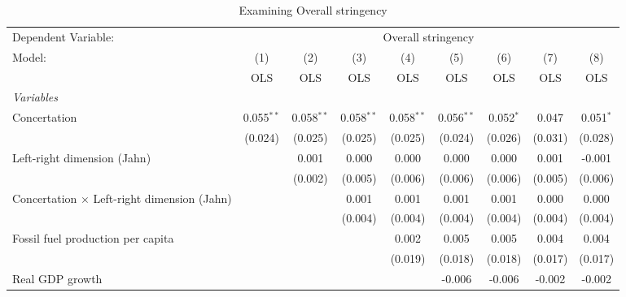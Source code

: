 
\begin{table}[htbp]
   \caption{Examining Overall stringency}
   \centering
   \begin{tabular}{lcccccccc}
      \toprule
      Dependent Variable: & \multicolumn{8}{c}{Overall stringency}\\
      Model:                                             & (1)          & (2)          & (3)          & (4)          & (5)          & (6)         & (7)     & (8)\\  
                                                         &  OLS         & OLS          & OLS          & OLS          & OLS          & OLS         & OLS     & OLS\\  
      \midrule
      \emph{Variables}\\
      Concertation                                       & 0.055$^{**}$ & 0.058$^{**}$ & 0.058$^{**}$ & 0.058$^{**}$ & 0.056$^{**}$ & 0.052$^{*}$ & 0.047   & 0.051$^{*}$\\   
                                                         & (0.024)      & (0.025)      & (0.025)      & (0.025)      & (0.024)      & (0.026)     & (0.031) & (0.028)\\   
      Left-right dimension (Jahn)                        &              & 0.001        & 0.000        & 0.000        & 0.000        & 0.000       & 0.001   & -0.001\\   
                                                         &              & (0.002)      & (0.005)      & (0.006)      & (0.006)      & (0.006)     & (0.005) & (0.006)\\   
      Concertation $\times$ Left-right dimension (Jahn)  &              &              & 0.001        & 0.001        & 0.001        & 0.001       & 0.000   & 0.000\\   
                                                         &              &              & (0.004)      & (0.004)      & (0.004)      & (0.004)     & (0.004) & (0.004)\\   
      Fossil fuel production per capita                  &              &              &              & 0.002        & 0.005        & 0.005       & 0.004   & 0.004\\   
                                                         &              &              &              & (0.019)      & (0.018)      & (0.018)     & (0.017) & (0.017)\\   
      Real GDP growth                                    &              &              &              &              & -0.006       & -0.006      & -0.002  & -0.002\\   

\end{tabular}
\end{table}
